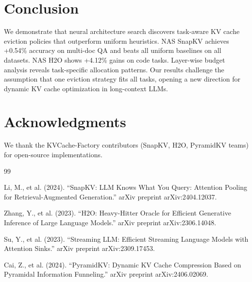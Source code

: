 \documentclass[11pt,a4paper]{article}
\begin{document}
\section{Conclusion}

We demonstrate that neural architecture search discovers task-aware KV cache eviction policies that outperform uniform heuristics. NAS SnapKV achieves +0.54\% accuracy on multi-doc QA and beats all uniform baselines on all datasets. NAS H2O shows +4.12\% gains on code tasks. Layer-wise budget analysis reveals task-specific allocation patterns. Our results challenge the assumption that one eviction strategy fits all tasks, opening a new direction for dynamic KV cache optimization in long-context LLMs.

\section*{Acknowledgments}

We thank the KVCache-Factory contributors (SnapKV, H2O, PyramidKV teams) for open-source implementations.

\begin{thebibliography}{99}

 Li, M., et al. (2024). ``SnapKV: LLM Knows What You Query: Attention Pooling for Retrieval-Augmented Generation.'' arXiv preprint arXiv:2404.12037.

 Zhang, Y., et al. (2023). ``H2O: Heavy-Hitter Oracle for Efficient Generative Inference of Large Language Models.'' arXiv preprint arXiv:2306.14048.

 Su, Y., et al. (2023). ``Streaming LLM: Efficient Streaming Language Models with Attention Sinks.'' arXiv preprint arXiv:2309.17453.

 Cai, Z., et al. (2024). ``PyramidKV: Dynamic KV Cache Compression Based on Pyramidal Information Funneling.'' arXiv preprint arXiv:2406.02069.

\end{thebibliography}
\end{document}
